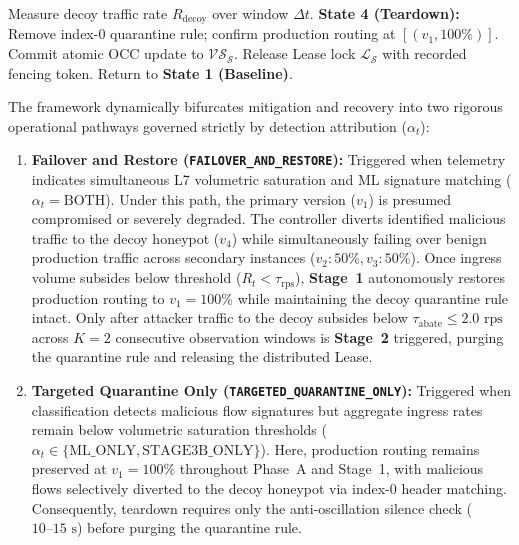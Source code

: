 \begin{algorithm}[!t]
\begin{algorithmic}[1]
        \State {}
        \State Measure decoy traffic rate $R_{\text{decoy}}$ over window $\Delta t$.
            \State \textbf{State 4 (Teardown):}
            \State Remove index-0 quarantine rule; confirm production routing at $[(v_1, 100\%)]$.
            \State Commit atomic OCC update to $\mathcal{VS}_{\mathcal{S}}$.
            \State Release Lease lock $\mathcal{L}_{\mathcal{S}}$ with recorded fencing token.
            \State Return to \textbf{State 1 (Baseline)}.
        \EndIf
    \EndIf
\EndWhile
\end{algorithmic}
\end{algorithm}

The framework dynamically bifurcates mitigation and recovery into two rigorous operational pathways governed strictly by detection attribution ($\alpha_t$):
\begin{enumerate}
    \item \textbf{Failover and Restore (\texttt{FAILOVER\_AND\_RESTORE}):} Triggered when telemetry indicates simultaneous L7 volumetric saturation and ML signature matching ($\alpha_t = \text{BOTH}$). Under this path, the primary version ($v_1$) is presumed compromised or severely degraded. The controller diverts identified malicious traffic to the decoy honeypot ($v_4$) while simultaneously failing over benign production traffic across secondary instances ($v_2:50\%, v_3:50\%$). Once ingress volume subsides below threshold ($R_t < \tau_{\text{rps}}$), \textbf{Stage~1} autonomously restores production routing to $v_1=100\%$ while maintaining the decoy quarantine rule intact. Only after attacker traffic to the decoy subsides below $\tau_{\text{abate}} \le 2.0\text{ rps}$ across $K=2$ consecutive observation windows is \textbf{Stage~2} triggered, purging the quarantine rule and releasing the distributed Lease.
    \item \textbf{Targeted Quarantine Only (\texttt{TARGETED\_QUARANTINE\_ONLY}):} Triggered when classification detects malicious flow signatures but aggregate ingress rates remain below volumetric saturation thresholds ($\alpha_t \in \{\text{ML\_ONLY}, \text{STAGE3B\_ONLY}\}$). Here, production routing remains preserved at $v_1=100\%$ throughout Phase~A and Stage~1, with malicious flows selectively diverted to the decoy honeypot via index-0 header matching. Consequently, teardown requires only the anti-oscillation silence check ($10\text{--}15\text{ s}$) before purging the quarantine rule.
\end{enumerate}

